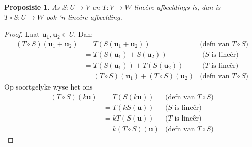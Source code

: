 \documentclass[a4paper,11pt]{book}
\newtheorem{proposition}[theorem]{Proposisie}
\theoremstyle{definition}
\newcommand{\ve}[1]{\mathbf{#1}}
\begin{document}
\begin{proposition} As $S : U \rightarrow V$ en $T : V \rightarrow W$
	line{\^e}re afbeeldings is, dan is $T \circ S : U \rightarrow W$ ook 'n
	line{\^e}re afbeelding.
\end{proposition}

\begin{proof}
	Laat $\ve{u_1}, \ve{u}_2 \in U$. Dan:
	\begin{align*}
		(T \circ S) (\ve{u}_1 + \ve{u}_2)	 &= T(S(\ve{u}_1 + \ve{u}_2)) &
		\mbox{(defn van $T \circ S$)} \\
		&= T(S(\ve{u}_1) + S(\ve{u}_2)) & \mbox{ ($S$ is line{\^e}r)} \\
		&= T(S(\ve{u}_1)) + T(S(\ve{u}_2)) & \mbox{ ($T$ is line{\^e}r)} \\
		&= (T \circ S) (\ve{u}_1) + (T \circ S)(\ve{u}_2) & \mbox{(defn van
		$T \circ S$)}
	\end{align*}
	Op soortgelyke wyse het ons
	\begin{align*}
		(T \circ S) (k \ve{u}) &= T(S(k \ve{u})) & \mbox{(defn van $T \circ
		S$)} \\
		&= T(kS(\ve{u})) & \mbox{($S$ is line{\^e}r)} \\
		&= k T(S(\ve{u})) & \mbox{($T$ is line{\^e}r)} \\
		&= k (T \circ S) (\ve{u}) & \mbox{(defn van $T \circ S$)} 
	\end{align*}

\end{proof}
\end{document}
